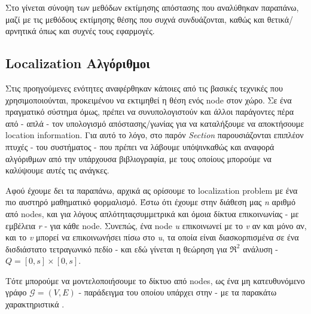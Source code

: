 Στο  γίνεται σύνοψη των μεθόδων εκτίμησης απόστασης
που αναλύθηκαν παραπάνω, μαζί με τις μεθόδους εκτίμησης θέσης που συχνά συνδυάζονται, καθώς και θετικά/αρνητικά όπως και συχνές τους εφαρμογές. 

\subsection{Localization Αλγόριθμοι} \label{sec:Chapter3-3} %
Στις προηγούμενες ενότητες αναφέρθηκαν κάποιες από τις βασικές τεχνικές που χρησιμοποιούνται, 
προκειμένου να εκτιμηθεί η θέση ενός node στον χώρο. Σε ένα πραγματικό σύστημα όμως, πρέπει να συνυπολογιστούν 
και άλλοι παράγοντες πέρα από - απλά - τον υπολογισμό απόστασης/γωνίας για να καταλήξουμε να αποκτήσουμε location information. 
Για αυτό το λόγο, στο παρόν \emph{Section} παρουσιάζονται επιπλέον πτυχές - του συστήματος - που πρέπει να λάβουμε 
υπόψιν\udot καθώς και αναφορά αλγό\-ρι\-θμων από την υπάρχουσα βιβλιογραφία, με τους οποίους μπορούμε να καλύψουμε αυτές τις
ανάγκες. 

Αφού έχουμε δει τα παραπάνω, αρχικά ας ορίσουμε το localization problem με ένα πιο αυστηρό μαθηματικό φορμαλισμό.
Έστω ότι έχουμε στην διάθεση μας \emph{n} αριθμό από nodes, και για λόγους απλότητας\udot συμμετρικά και όμοια δίκτυα
επικοινωνίας - με εμβέλεια \emph{r} - για κάθε node. Συνεπώς, ένα node \emph{u} επικοινωνεί με το \emph{v} αν και μόνο αν, και το
\emph{v} μπορεί να επικοινωνήσει πίσω στο \emph{u}, τα οποία είναι δια\-σκο\-ρπι\-σμένα σε ένα δισδιάστατο τετραγωνικό
πεδίο - και εδώ γίνεται η θεώρηση για $\mathfrak{R}^2$ ανάλυση - \emph{$Q=[0,s]\times[0,s]$}. 

Τότε μπορούμε να μοντελοποιήσουμε το δίκτυο από nodes, ως ένα μη κατευθυνόμενο γράφο $\mathcal{G} = (V, E)$ - παράδειγμα του οποίου υπάρχει στην  - με τα 
παρακάτω χαρακτηριστικά \cite{wsn-Localization-systems}.  

